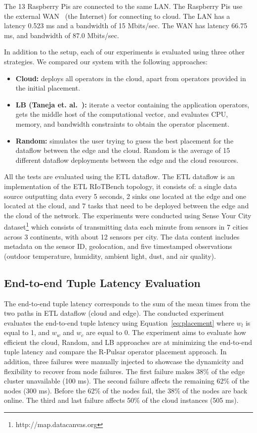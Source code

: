 The 13 Raspberry Pis are connected to the same LAN. The Raspberry Pis use the external WAN~\cite{Ha:2013} (the Internet) for connecting to cloud. The LAN has a latency 0.523 ms and a bandwidth of 15 Mbits/sec. The WAN has latency 66.75 ms, and bandwidth of 87.0 Mbits/sec.

In addition to the setup, each of our experiments is evaluated using three other strategies. We compared our system with the following approaches:

\begin{itemize}	
\item \textbf{Cloud:} deploys all operators in the cloud, apart from operators provided in the initial placement.

\item \textbf{LB (Taneja et. al.~\cite{Taneja:2017}):} iterate a vector containing the application operators, gets the middle host of the computational vector, and evaluates CPU, memory, and bandwidth constraints to obtain the operator placement.

\item \textbf{Random:} simulates the user trying to guess the best placement for the dataflow between the edge and the cloud. Random is the average of 15 different dataflow deployments between the edge and the cloud resources.
\end{itemize}

All the tests are evaluated using the ETL dataflow. The ETL dataflow is an implementation of the ETL RIoTBench topology, it consists of: a single data source outputting data every 5 seconds, 2 sinks one located at the edge and one located at the cloud, and 7 tasks that need to be deployed between the edge and the cloud of the network. The experiments were conducted using Sense Your City dataset\footnote{http://map.datacanvas.org} which consists of transmitting data each minute from sensors in 7 cities across 3 continents, with about 12 sensors per city. The data content includes metadata on the sensor ID, geolocation, and five timestamped observations (outdoor temperature, humidity, ambient light, dust, and air quality).
\subsection{End-to-end Tuple Latency Evaluation}

The end-to-end tuple latency corresponds to the sum of the mean times from the two paths in ETL dataflow (cloud and edge). The conducted experiment evaluates the end-to-end tuple latency using Equation~\ref{eq:placement} where $w_l$ is equal to 1, and $w_w$ and $w_c$ are equal to 0. The experiment aims to evaluate how efficient the cloud, Random, and LB approaches are at minimizing the end-to-end tuple latency and compare the R-Pulsar operator placement approach. In addition, three failures were manually injected to showcase the dynamicity and flexibility to recover from node failures. The first failure makes 38\% of the edge cluster unavailable (100 ms). The second failure affects the remaining 62\% of the nodes (300 ms). Before the 62\% of the nodes fail, the 38\% of the nodes are back online. The third and last failure affects 50\% of the cloud instances (505 ms).

